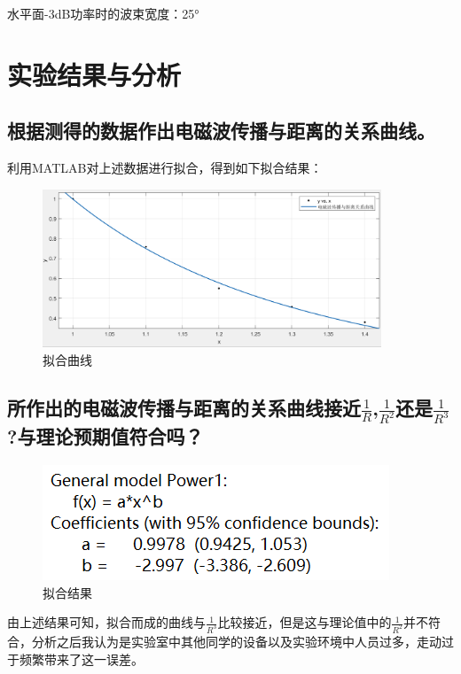 \documentclass{../source/zjureport}
\begin{document}
        水平面-3dB功率时的波束宽度：25°

    \section{实验结果与分析}
        \subsection{根据测得的数据作出电磁波传播与距离的关系曲线。}
        利用MATLAB对上述数据进行拟合，得到如下拟合结果：
        \begin{figure}[H]
            \centering
            \includegraphics[width = 0.9\textwidth]{figure/电磁波传输与距离关系图.png}
            \caption{拟合曲线}
        \end{figure}

        
        \subsection{所作出的电磁波传播与距离的关系曲线接近$\frac{1}{R}$,$\frac{1}{R^2}$还是$\frac{1}{R^3}$?与理论预期值符合吗？}
    
        \begin{figure}[H]
            \centering
            \includegraphics[]{figure/2拟合结果.png}
            \caption{拟合结果}
        \end{figure}

        由上述结果可知，拟合而成的曲线与$\frac{1}{R^3}$比较接近，但是这与理论值中的$\frac{1}{R^2}$并不符合，分析之后我认为是实验室中其他同学的设备以及实验环境中人员过多，走动过于频繁带来了这一误差。
\end{document}
